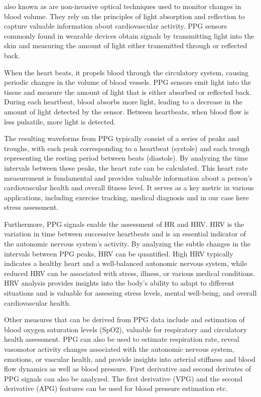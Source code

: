  also known as   are non-invasive optical techniques used to monitor changes in blood volume. They rely on the principles of light absorption and reflection to capture valuable information about cardiovascular activity. \gls{PPG} sensors commonly found in wearable devices obtain  signals by transmitting light into the skin and measuring the amount of light either transmitted through or reflected back.\parencite{ppg} 

When the heart beats, it propels blood through the circulatory system, causing periodic changes in the volume of blood vessels. PPG sensors emit light into the tissue and measure the amount of light that is either absorbed or reflected back. During each heartbeat, blood absorbs more light, leading to a decrease in the amount of light detected by the sensor. Between heartbeats, when blood flow is less pulsatile, more light is detected.\parencite{ppg2}

The resulting waveforms from PPG typically consist of a series of peaks and troughs, with each peak corresponding to a heartbeat (systole) and each trough representing the resting period between beats (diastole). By analyzing the time intervals between these peaks, the heart rate can be calculated. This heart rate measurement is fundamental and provides valuable information about a person's cardiovascular health and overall fitness level. It serves as a key metric in various applications, including exercise tracking, medical diagnosis and in our case here stress assessment.

Furthermore, PPG signals enable the assessment of HR and \gls{HRV}. HRV is the variation in time between successive heartbeats and is an essential indicator of the autonomic nervous system's activity. By analyzing the subtle changes in the intervals between PPG peaks, HRV can be quantified. High HRV typically indicates a healthy heart and a well-balanced autonomic nervous system, while reduced HRV can be associated with stress, illness, or various medical conditions. HRV analysis provides insights into the body's ability to adapt to different situations and is valuable for assessing stress levels, mental well-being, and overall cardiovascular health.

Other measures that can be derived from PPG data include  and estimation of blood oxygen saturation levels (SpO2), valuable for respiratory and circulatory health assessment. PPG can also be used to estimate respiration rate, reveal vasomotor activity changes associated with the autonomic nervous system, emotions, or vascular health, and provide insights into arterial stiffness and blood flow dynamics as well as blood pressure. First derivative and second derivates of PPG signals can also be analyzed. The first derivative (\gls{VPG}) and the second derivative (\gls{APG}) features can be used for  blood pressure estimation etc.\parencite{apg}


